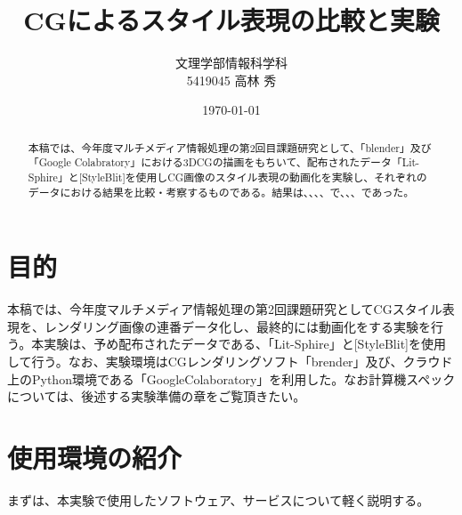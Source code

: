 \documentclass[dvipdfmx]{jsarticle}
\title{CGによるスタイル表現の比較と実験}
\author{文理学部情報科学科\\5419045 高林 秀}
\date{\today}
\begin{document}
\maketitle

\begin{abstract}
  本稿では、今年度マルチメディア情報処理の第2回目課題研究として、「blender」及び「Google Colabratory」における3DCGの描画をもちいて、配布されたデータ「Lit-Sphire」と[StyleBlit]を使用しCG画像のスタイル表現の動画化を実験し、それぞれのデータにおける結果を比較・考察するものである。結果は、、、、で、、、であった。
\end{abstract}

\section{目的}
本稿では、今年度マルチメディア情報処理の第2回課題研究としてCGスタイル表現を、レンダリング画像の連番データ化し、最終的には動画化をする実験を行う。本実験は、予め配布されたデータである、「Lit-Sphire」と[StyleBlit]を使用して行う。なお、実験環境はCGレンダリングソフト「brender」及び、クラウド上のPython環境である「GoogleColaboratory」を利用した。なお計算機スペックについては、後述する実験準備の章をご覧頂きたい。
\section{使用環境の紹介}
まずは、本実験で使用したソフトウェア、サービスについて軽く説明する。
\end{document}

